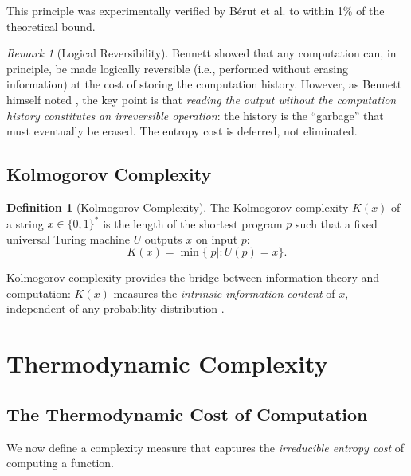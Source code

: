 \documentclass[12pt, a4paper]{article}
\theoremstyle{plain}
\theoremstyle{definition}
\newtheorem{definition}[theorem]{Definition}
\theoremstyle{remark}
\newtheorem{remark}[theorem]{Remark}
\begin{document}
This principle was experimentally verified by B\'erut et al.
\citep{BeruttEtAl2012} to within 1\% of the theoretical bound.

\begin{remark}[Logical Reversibility]
  Bennett \citep{Bennett1973} showed that any computation can, in principle,
  be made logically reversible (i.e., performed without erasing information)
  at the cost of storing the computation history. However, as Bennett himself
  noted \citep{Bennett1982}, the key point is that \emph{reading the output
  without the computation history constitutes an irreversible operation}:
  the history is the ``garbage'' that must eventually be erased. The entropy
  cost is deferred, not eliminated.
\end{remark}

\subsection{Kolmogorov Complexity}

\begin{definition}[Kolmogorov Complexity]\label{def:kolmogorov}
  The Kolmogorov complexity $K(x)$ of a string $x \in \{0,1\}^*$ is the
  length of the shortest program $p$ such that a fixed universal Turing
  machine $U$ outputs $x$ on input $p$:
  \begin{equation}
    K(x) = \min\{|p| : U(p) = x\}.
  \end{equation}
\end{definition}

Kolmogorov complexity provides the bridge between information theory and
computation: $K(x)$ measures the \emph{intrinsic information content} of $x$,
independent of any probability distribution \citep{Kolmogorov1965, LiVitanyi2008}.

\section{Thermodynamic Complexity}\label{sec:thermo}

\subsection{The Thermodynamic Cost of Computation}

We now define a complexity measure that captures the \emph{irreducible
entropy cost} of computing a function.
\end{document}
